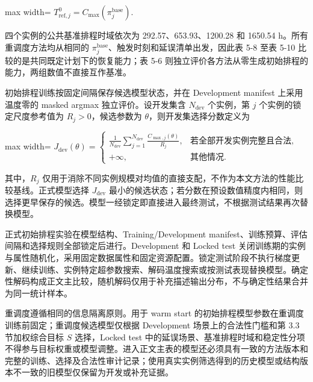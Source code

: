 \documentclass[journal,10pt]{IEEEtran}
\begin{document}
\begin{center}
\begin{adjustbox}{max width=\columnwidth}
$\displaystyle
T_{\mathrm{ref},j}^0=C_{\max}(\pi_j^{\mathrm{base}}).
$
\end{adjustbox}
\end{center}

四个实例的公共基准排程时域依次为 292.57、653.93、1200.28 和 1650.54 h。所有重调度方法均从相同的 \(\pi_j^{\mathrm{base}}\)、触发时刻和延误清单出发，因此表 5-8 至表 5-10 比较的是共同既定计划下的恢复能力；表 5-6 则独立评价各方法从零生成初始排程的能力，两组数值不直接互作基准。

初始排程训练按固定间隔保存候选模型状态，并在 Development manifest 上采用温度零的 masked argmax 独立评价。设开发集含 \(N_{\mathrm{dev}}\) 个实例，第 \(j\) 个实例的锁定尺度参考值为 \(R_j>0\)，候选参数为 \(\theta\)，则开发集选择分数定义为

\begin{center}
\begin{adjustbox}{max width=\columnwidth}
$\displaystyle
J_{\mathrm{dev}}(\theta)=
\begin{cases}
\displaystyle\frac{1}{N_{\mathrm{dev}}}
\sum_{j=1}^{N_{\mathrm{dev}}}
\frac{C_{\max,j}(\theta)}{R_j},
& \text{若全部开发实例完整且合法},\\[6pt]
+\infty, & \text{其他情况}.
\end{cases}
$
\end{adjustbox}
\end{center}

其中，\(R_j\) 仅用于消除不同实例规模对均值的直接支配，不作为本文方法的性能比较基线。正式模型选择 \(J_{\mathrm{dev}}\) 最小的候选状态；若分数在预设数值精度内相同，则选择更早保存的候选。模型一经锁定即直接进入最终测试，不根据测试结果再次替换模型。

正式初始排程实验在模型结构、Training/Development manifest、训练预算、评估间隔和选择规则全部锁定后进行。Development 和 Locked test 关闭训练期的实例与属性随机化，采用固定数据属性和固定资源配置。锁定测试阶段不执行梯度更新、继续训练、实例特定超参数搜索、解码温度搜索或按测试表现替换模型。确定性解码构成正文主比较，随机解码仅用于补充描述输出分布，不与确定性结果合并为同一统计样本。

重调度遵循相同的信息隔离原则。用于 warm start 的初始排程模型参数在重调度训练前固定；重调度候选模型仅根据 Development 场景上的合法性门槛和第 3.3 节加权综合目标 \(S\) 选择，Locked test 中的延误场景、基准排程时域和稳定性分项不得参与目标权重或模型调整。进入正文主表的模型还必须具有一致的方法版本和完整的训练、选择及合法性审计记录；使用真实实例筛选得到的历史模型或结构版本不一致的旧模型仅保留为开发或补充证据。
\end{document}

